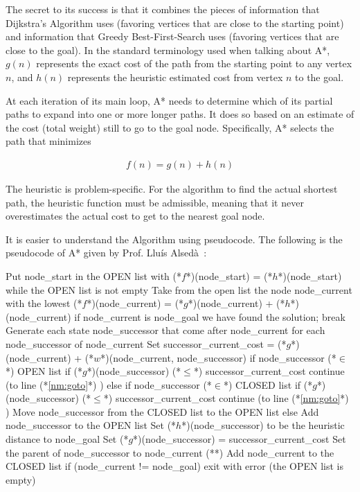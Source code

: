 The secret to its success is that it combines the pieces of information that Dijkstra’s Algorithm uses (favoring vertices that are close to the starting point) and information that Greedy Best-First-Search uses (favoring vertices that are close to the goal). In the standard terminology used when talking about A*, $g(n)$ represents the exact cost of the path from the starting point to any vertex $n$, and $h(n)$ represents the heuristic estimated cost from vertex $n$ to the goal.

At each iteration of its main loop, A* needs to determine which of its partial paths to expand into one or more longer paths. It does so based on an estimate of the cost (total weight) still to go to the goal node. Specifically, A* selects the path that minimizes

\begin{align}
    f(n) = g(n) + h(n)
\end{align}

The heuristic is problem-specific. For the algorithm to find the actual shortest path, the heuristic function must be admissible, meaning that it never overestimates the actual cost to get to the nearest goal node.

\bigskip
It is easier to understand the Algorithm using pseudocode. The following is the pseudocode of A* given by Prof. Lluís Alsedà~\cite{AlsedaPseudo}:

\begin{algorithm}[caption={A* Algorithm Pseudocode}, label=sn:astar-pseudo, morekeywords={node_start, node_current, node_goal, node_successor, OPEN, CLOSED}]
Put node_start in the OPEN list with (*$f$*)(node_start) = (*$h$*)(node_start)
while the OPEN list is not empty {
  Take from the open list the node node_current with the lowest
    (*$f$*)(node_current) = (*$g$*)(node_current) + (*$h$*)(node_current)
  if node_current is node_goal {
    we have found the solution; break
  }
  Generate each state node_successor that come after node_current
  for each node_successor of node_current {
    Set successor_current_cost = (*$g$*)(node_current) + (*$w$*)(node_current, node_successor)
    if node_successor (*$\in$*) OPEN list {
      if (*$g$*)(node_successor) (*$\leq$*) successor_current_cost {
        continue (to line (*\ref{nm:goto}*) )
      }
    } else if node_successor (*$\in$*) CLOSED list {
      if (*$g$*)(node_successor) (*$\leq$*) successor_current_cost {
        continue (to line (*\ref{nm:goto}*) )
      }
      Move node_successor from the CLOSED list to the OPEN list
    } else {
      Add node_successor to the OPEN list
      Set (*$h$*)(node_successor) to be the heuristic distance to node_goal
    }
    Set (*$g$*)(node_successor) = successor_current_cost
    Set the parent of node_successor to node_current
  } (*\label{nm:goto}*)
  Add node_current to the CLOSED list
}
if (node_current != node_goal) exit with error (the OPEN list is empty)
\end{algorithm}


